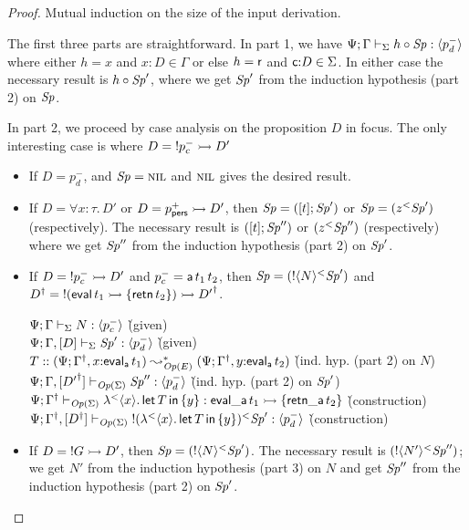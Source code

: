 \begin{proof}
Mutual induction on the size 
of the input derivation.

The first three parts are straightforward. In part 1, we have
${\Psi}; {\Gamma} \vdash_{\Sigma} {{h} \circ {{\it Sp}}} : {\langle {p^-_d} \rangle}$ where
either $h = x$ and $x{:}D \in \Gamma$ or else $h = {\sf r}$ and ${\sf
  c}{:}D \in \Sigma$. In either case the necessary result is
${h} \circ {{\it Sp}'}$, where we get ${\it Sp}'$ from the induction hypothesis
(part 2) on ${\it Sp}$.

In part 2, we proceed by case analysis on the proposition $D$ in focus. 
The only interesting case is where $D = {!}p^-_c \rightarrowtail D'$
\begin{itemize}
\item If $D = p_d^-$, and ${\it Sp} = \textsc{nil}$ and $\textsc{nil}$ gives the desired result.

\item If $D = \forall x{:}\tau.\,D'$ or $D = p^+_{\sf
    pers} \rightarrowtail D'$, then ${\it Sp} = ([{t}]; {{\it Sp}'})$ 
  or ${\it Sp} = ({z}{^{<}}{{\it Sp}'})$ (respectively). The necessary result is
  $([{t}]; {{\it Sp}''})$ 
  or $({z}{^{<}}{{\it Sp}''})$ (respectively) where we get ${\it Sp}''$ from the
  induction hypothesis (part 2) on ${\it Sp}'$. 

\item If $D = {!}p^-_c \rightarrowtail D'$ and $p^-_c = {\sf a}\,t_1\,t_2$, then 
  ${\it Sp} = ({{!}{\langle {N} \rangle}}{^{<}}{{\it Sp}'})$
  and ${{D}^\dag} = {!}({\sf eval}\,t_1 \rightarrowtail \{ {\sf retn}\,t_2 \}) \rightarrowtail {{D'}^\dag}$.

  \begin{tabbing}
  ${\Psi}; {\Gamma} \vdash_{\Sigma} {N} : {\langle {p^-_c} \rangle}$
  \` (given)
  \\
  ${\Psi}; {\Gamma, [D]} \vdash_{\Sigma} {{\it Sp}'} : {\langle {p^-_d} \rangle}$
  \` (given)
  \\
  $T :: (\Psi; {{\Gamma}^\dag}, x{:}{\sf eval_a}\,t_1)
    \leadsto^*_{{\it Op}({E})} (\Psi; {{\Gamma}^\dag}, y{:}{\sf eval_a}\,t_2)$
  \` (ind. hyp. (part 2) on $N$)
  \\
  ${\Psi}; {\Gamma, [{{D'}^\dag}]} \vdash_{{\it Op}({\Sigma})} {{\it Sp}''} : {\langle {p_d^-} \rangle}$
  \` (ind. hyp. (part 2) on ${\it Sp}'$)
  \\
  ${\Psi}; {{{\Gamma}^\dag}} \vdash_{{\it Op}({\Sigma})} {{\lambda}^{<}{\langle {x} \rangle . {\,{\sf let}\,{T}\,{\sf in}\,\{ {y} \}}}} : {{\sf eval\_a}\,t_1 \rightarrowtail \{ {\sf retn\_a}\,t_2 \}}$
  \` (construction)
  \\
  ${\Psi}; {{{\Gamma}^\dag}, [{{D}^\dag}]} \vdash_{{\it Op}({\Sigma})} {{{!}{({\lambda}^{<}{\langle {x} \rangle . {\,{\sf let}\,{T}\,{\sf in}\,\{ {y} \}}})}}{^{<}}{{\it Sp}'}} : {\langle {p^-_d} \rangle}$
  \` (construction)
  \end{tabbing}
\item If $D = {!}G \rightarrowtail D'$, then ${\it Sp} =
  ({{!}{\langle {N} \rangle}}{^{<}}{{\it Sp}'})$. The necessary result is
  $({{!}{\langle {N'} \rangle}}{^{<}}{{\it Sp}''})$; we get $N'$ from the
  induction hypothesis (part 3) on $N$ and get ${\it Sp}''$ from the induction
  hypothesis (part 2) on ${\it Sp}'$.
\end{itemize}


\end{proof}

